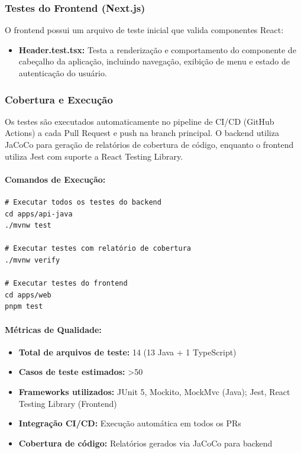 \documentclass[12pt,a4paper]{article}
\begin{document}
\subsubsection{Testes do Frontend (Next.js)}

O frontend possui um arquivo de teste inicial que valida componentes React:

\begin{itemize}
    \item \textbf{Header.test.tsx:} Testa a renderização e comportamento do componente de cabeçalho da aplicação, incluindo navegação, exibição de menu e estado de autenticação do usuário.
\end{itemize}

\subsubsection{Cobertura e Execução}

Os testes são executados automaticamente no pipeline de CI/CD (GitHub Actions) a cada Pull Request e push na branch principal. O backend utiliza JaCoCo para geração de relatórios de cobertura de código, enquanto o frontend utiliza Jest com suporte a React Testing Library.

\paragraph{Comandos de Execução:}

\begin{verbatim}
# Executar todos os testes do backend
cd apps/api-java
./mvnw test

# Executar testes com relatório de cobertura
./mvnw verify

# Executar testes do frontend
cd apps/web
pnpm test
\end{verbatim}

\paragraph{Métricas de Qualidade:}

\begin{itemize}
    \item \textbf{Total de arquivos de teste:} 14 (13 Java + 1 TypeScript)
    \item \textbf{Casos de teste estimados:} \textgreater50
    \item \textbf{Frameworks utilizados:} JUnit 5, Mockito, MockMvc (Java); Jest, React Testing Library (Frontend)
    \item \textbf{Integração CI/CD:} Execução automática em todos os PRs
    \item \textbf{Cobertura de código:} Relatórios gerados via JaCoCo para backend
\end{itemize}
\end{document}
